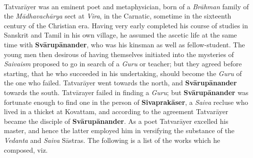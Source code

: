 \documentclass{article}
\begin{document}
\paragraph{}
Tatvar\={a}yer was an eminent poet and metaphysician, born of a \emph{Br\={a}hman} family of the \emph{M\={a}dhavach\={a}rya} sect at \emph{Vira}, in the Carnatic, sometime in the sixteenth century of the Christian era. Having very early completed his course of studies in Sanskrit and Tamil in his own village, he assumed the ascetic life at the same time with \textbf{Sv\={a}rup\={a}nander}, who was his kinsman as well as fellow-student. The young men then desirous of having themselves initiated into the mysteries of \emph{Saivaism} proposed to go in search of a \emph{Guru} or teacher; but they agreed before starting, that he who succeeded in his undertaking, should become the \emph{Guru} of the one who failed. Tatvar\={a}yer went towards the north, and \textbf{Sv\={a}rup\={a}nander} towards the south. Tatv\={a}rayer failed in finding a \emph{Guru}; but \textbf{Sv\={a}rup\={a}nander} was fortunate enough to find one in the person of \textbf{Sivaprak\={a}ser}, a \emph{Saiva} recluse who lived in a thicket at Kovattam, and according to the agreement Tatvar\={a}yer became the disciple of \textbf{Sv\={a}rup\={a}nander}. As a poet Tatvar\={a}yer excelled his master, and hence the latter employed him in versifying the substance of the \emph{Vedanta} and \emph{Saiva} S\={a}stras. The following is a list of the works which he composed, viz.
\end{document}
